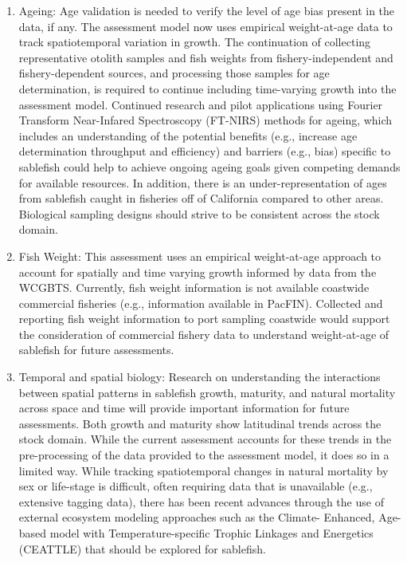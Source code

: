 \documentclass[
  english,
]{article}
\begin{document}
\begin{enumerate}
\item Ageing: Age validation is needed to verify the level of age bias present in the data, if any.
The assessment model now uses empirical weight-at-age data to track spatiotemporal variation in growth.
The continuation of collecting representative otolith samples and fish weights from fishery-independent and fishery-dependent
sources, and processing those samples for age determination, is required to continue including time-varying
growth into the assessment model. Continued research and pilot applications using Fourier Transform
Near-Infared Spectroscopy (FT-NIRS) methods for ageing, which includes an understanding of the potential
benefits (e.g., increase age determination throughput and efficiency) and barriers (e.g., bias)
specific to sablefish could help to achieve ongoing ageing goals given competing demands for available
resources. In addition, there is an under-representation of ages from sablefish caught in fisheries off of California
compared to other areas. Biological sampling designs should strive to be consistent across the stock domain.

\item Fish Weight: This assessment uses an empirical weight-at-age approach to account for spatially and time varying growth informed by data from the WCGBTS. Currently, fish weight information is not available coastwide commercial fisheries (e.g., information available in PacFIN).  Collected and reporting fish weight information to port sampling coastwide would support the consideration of commercial fishery data to understand weight-at-age of sablefish for future assessments. 

\item Temporal and spatial biology: Research on understanding the interactions between spatial patterns in
sablefish growth, maturity, and natural mortality across space and time will provide important information for future assessments.
Both growth and maturity show latitudinal trends across the stock domain. While the current assessment
accounts for these trends in the pre-processing of the data provided to the assessment model, it does so in a limited way.
While tracking spatiotemporal changes in natural mortality by sex or life-stage is difficult, often requiring data
that is unavailable (e.g., extensive tagging data), there has been recent advances through the use of external
ecosystem modeling approaches such as the Climate- Enhanced, Age-based model with Temperature-specific Trophic
Linkages and Energetics (CEATTLE) that should be explored for sablefish.

\end{enumerate}
\end{document}
